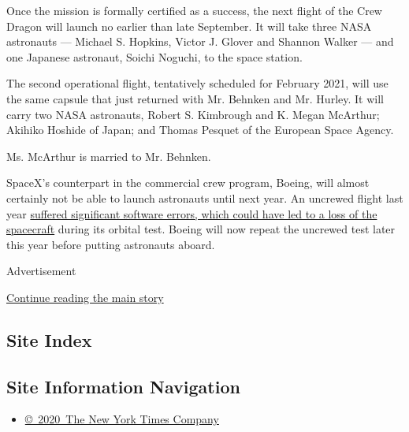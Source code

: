 Once the mission is formally certified as a success, the next flight of
the Crew Dragon will launch no earlier than late September. It will take
three NASA astronauts --- Michael S. Hopkins, Victor J. Glover and
Shannon Walker --- and one Japanese astronaut, Soichi Noguchi, to the
space station.

The second operational flight, tentatively scheduled for February 2021,
will use the same capsule that just returned with Mr. Behnken and Mr.
Hurley. It will carry two NASA astronauts, Robert S. Kimbrough and K.
Megan McArthur; Akihiko Hoshide of Japan; and Thomas Pesquet of the
European Space Agency.

Ms. McArthur is married to Mr. Behnken.

SpaceX's counterpart in the commercial crew program, Boeing, will almost
certainly not be able to launch astronauts until next year. An uncrewed
flight last year
\href{https://www.nytimes3xbfgragh.onion/2020/07/07/science/boeing-starliner-nasa.html}{suffered
significant software errors, which could have led to a loss of the
spacecraft} during its orbital test. Boeing will now repeat the uncrewed
test later this year before putting astronauts aboard.

Advertisement

\protect\hyperlink{after-bottom}{Continue reading the main story}

\hypertarget{site-index}{%
\subsection{Site Index}\label{site-index}}

\hypertarget{site-information-navigation}{%
\subsection{Site Information
Navigation}\label{site-information-navigation}}

\begin{itemize}
\tightlist
\item
  \href{https://help.nytimes3xbfgragh.onion/hc/en-us/articles/115014792127-Copyright-notice}{©~2020~The
  New York Times Company}
\end{itemize}

